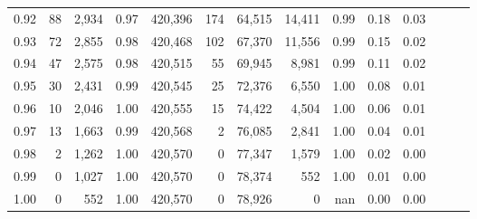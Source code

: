 \begin{tabular}{rrrrrrrrrrrrrr}
0.92 &     88 &  2,934 &  0.97 &  420,396 &      174 &  64,515 &  14,411 &  0.99 &  0.18 &      0.03 \\
0.93 &     72 &  2,855 &  0.98 &  420,468 &      102 &  67,370 &  11,556 &  0.99 &  0.15 &      0.02 \\
0.94 &     47 &  2,575 &  0.98 &  420,515 &       55 &  69,945 &   8,981 &  0.99 &  0.11 &      0.02 \\
0.95 &     30 &  2,431 &  0.99 &  420,545 &       25 &  72,376 &   6,550 &  1.00 &  0.08 &      0.01 \\
0.96 &     10 &  2,046 &  1.00 &  420,555 &       15 &  74,422 &   4,504 &  1.00 &  0.06 &      0.01 \\
0.97 &     13 &  1,663 &  0.99 &  420,568 &        2 &  76,085 &   2,841 &  1.00 &  0.04 &      0.01 \\
0.98 &      2 &  1,262 &  1.00 &  420,570 &        0 &  77,347 &   1,579 &  1.00 &  0.02 &      0.00 \\
0.99 &      0 &  1,027 &  1.00 &  420,570 &        0 &  78,374 &     552 &  1.00 &  0.01 &      0.00 \\
1.00 &      0 &    552 &  1.00 &  420,570 &        0 &  78,926 &       0 &   nan &  0.00 &      0.00 \\
\bottomrule
\end{tabular}
